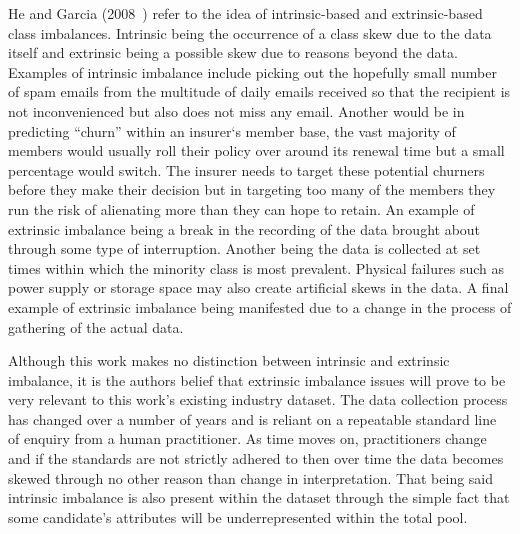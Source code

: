 He and Garcia (2008~\cite{he2008learning}) refer to the idea of intrinsic-based and extrinsic-based class imbalances. Intrinsic being the occurrence of a class skew due to the data itself and extrinsic being a possible skew due to reasons beyond the data. Examples of intrinsic imbalance include picking out the hopefully small number of spam emails from the multitude of daily emails received so that the recipient is not inconvenienced but also does not miss any email. Another would be in predicting ``churn'' within an insurer`s member base, the vast majority of members would usually roll their policy over around its renewal time but a small percentage would switch. The insurer needs to target these potential churners before they make their decision but in targeting too many of the members they run the risk of alienating more than they can hope to retain. An example of extrinsic imbalance being a break in the recording of the data brought about through some type of interruption. Another being the data is collected at set times within which the minority class is most prevalent. Physical failures such as power supply or storage space may also create artificial skews in the data. A final example of extrinsic imbalance being manifested due to a change in the process of gathering of the actual data. 
\par
Although this work makes no distinction between intrinsic and extrinsic imbalance, it is the authors belief that extrinsic imbalance issues will prove to be very relevant to this work's existing industry dataset. The data collection process has changed over a number of years and is reliant on a repeatable standard line of enquiry from a human practitioner. As time moves on, practitioners change and if the standards are not strictly adhered to then over time the data becomes skewed through no other reason than change in interpretation. That being said intrinsic imbalance is also present within the dataset through the simple fact that some candidate's attributes will be underrepresented within the total pool. 



